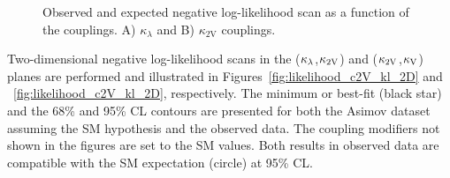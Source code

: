 \begin{figure}[ht!]
\captionsetup[subfigure]{justification=centering}
\centering
{}
\caption[Observed and expected negative log-likelihood scan as a function of the couplings]{\label{fig:likelihood_kl_c2V_1D}Observed and expected negative log-likelihood scan as a function of the couplings. A) $\kappa_{\lambda}$ and B) $\kappa_\text{2V}$ couplings.
}
\end{figure}

Two-dimensional negative log-likelihood scans in the ($\kappa_{\lambda}$,$\mathrm{\kappa_{2V} }$) and ($\mathrm{\kappa_{2V} }$,$\mathrm{\kappa_{V} }$) planes are performed and illustrated in Figures~\ref{fig:likelihood_c2V_kl_2D} and ~\ref{fig:likelihood_c2V_kl_2D}, respectively.  The minimum or best-fit (black star) and the 68\% and 95\% CL contours are presented for both the Asimov dataset assuming the SM hypothesis and the observed data. The coupling modifiers not shown in the figures are set to the SM values. Both results in observed data are compatible with the SM expectation (circle) at 95\% CL.

\clearpage


